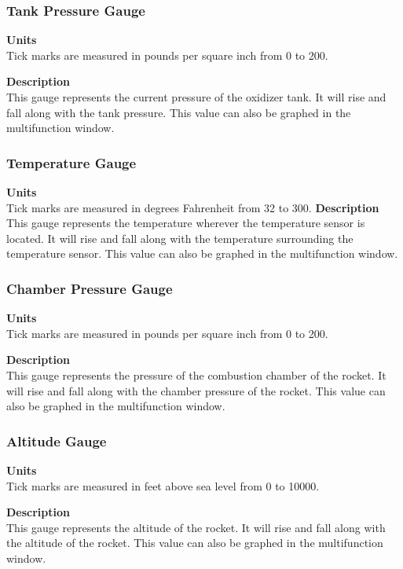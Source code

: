 \documentclass[10pt,draftclsnofoot,onecolumn,compsoc]{IEEEtran}
\begin{document}
\subsubsection{Tank Pressure Gauge}
{\bf Units} \\ Tick marks are measured in pounds per square inch from 0 to 200.\par
{\bf Description} \\ This gauge represents the current pressure of the oxidizer tank. It will rise and fall along with the tank pressure. This value can also be graphed in the multifunction window.\par

\subsubsection{Temperature Gauge}
{\bf Units} \\ Tick marks are measured in degrees Fahrenheit from 32 to 300. 
{\bf Description} \\ This gauge represents the temperature wherever the temperature sensor is located. It will rise and fall along with the temperature surrounding the temperature sensor. This value can also be graphed in the multifunction window. \par

\subsubsection{Chamber Pressure Gauge}
{\bf Units} \\ Tick marks are measured in pounds per square inch from 0 to 200.\par
{\bf Description} \\ This gauge represents the pressure of the combustion chamber of the rocket. It will rise and fall along with the chamber pressure of the rocket. This value can also be graphed in the multifunction window. \par

\subsubsection{Altitude Gauge}
{\bf Units} \\ Tick marks are measured in feet above sea level from 0 to 10000.\par
{\bf Description} \\ This gauge represents the altitude of the rocket. It will rise and fall along with the altitude of the rocket. This value can also be graphed in the multifunction window. \par
\end{document}
